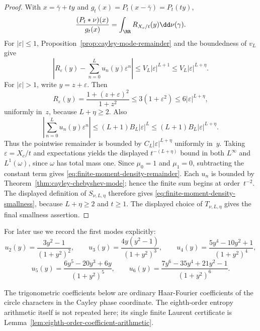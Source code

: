 \begin{proof}
With $x=\bar{\gamma}+ty$ and $g_t(x)=P_t(x-\bar{\gamma})=P_t(ty)$,
\[
\frac{(P_t*\nu)(x)}{g_t(x)}
=\int_{\RR}R_{X_c/t}(y)\dd\nu(\gamma).
\]
For $|\varepsilon|\le1$, Proposition~\ref{prop:cayley-mode-remainder} and
the boundedness of $v_L$ give
\[
\left|R_\varepsilon(y)-\sum_{n=0}^{L}u_n(y)\varepsilon^n\right|
    \le V_L |\varepsilon|^{L+1}
    \le V_L |\varepsilon|^{L+\eta}.
\]
For $|\varepsilon|>1$, write $y=z+\varepsilon$.  Then
\[
R_\varepsilon(y)=\frac{1+(z+\varepsilon)^2}{1+z^2}
\le 3(1+\varepsilon^2)
\le 6|\varepsilon|^{L+\eta},
\]
uniformly in~$z$, because $L+\eta\ge2$.  Also
\[
\left|\sum_{n=0}^{L}u_n(y)\varepsilon^n\right|
\le (L+1)B_L|\varepsilon|^L
\le (L+1)B_L|\varepsilon|^{L+\eta}.
\]
Thus the pointwise remainder is bounded by
$C_L|\varepsilon|^{L+\eta}$ uniformly in~$y$.
Taking $\varepsilon=X_c/t$ and expectations yields the displayed
$t^{-(L+\eta)}$ bound in both $L^\infty$ and $L^1(\omega)$, since $\omega$
has total mass one.  Since $\mu_0=1$ and $\mu_1=0$, subtracting the
constant term gives \eqref{eq:finite-moment-density-remainder}.  Each
$u_n$ is bounded by Theorem~\ref{thm:cayley-chebyshev-mode}; hence the
finite sum begins at order~$t^{-2}$.  The displayed definition of
$S_{\nu,L,\eta}$ therefore gives
\eqref{eq:finite-moment-density-smallness}, because $L+\eta\ge2$ and
$t\ge1$.  The displayed choice of $T_{\nu,L,\eta}$ gives the final
smallness assertion.
\end{proof}

For later use we record the first modes explicitly:
\begin{equation}\label{eq:cayley-first-modes}
u_2(y)=\frac{3y^2-1}{(1+y^2)^2},
\qquad
u_3(y)=\frac{4y(y^2-1)}{(1+y^2)^3},
\qquad
u_4(y)=\frac{5y^4-10y^2+1}{(1+y^2)^4},
\end{equation}
\begin{equation}\label{eq:cayley-next-modes}
u_5(y)=\frac{6y^5-20y^3+6y}{(1+y^2)^5},
\qquad
u_6(y)=\frac{7y^6-35y^4+21y^2-1}{(1+y^2)^6}.
\end{equation}

The trigonometric coefficients below are ordinary Haar-Fourier coefficients of
the circle characters in the Cayley phase coordinate.  The eighth-order
entropy arithmetic itself is not repeated here; its single finite Laurent
certificate is Lemma~\ref{lem:eighth-order-coefficient-arithmetic}.

